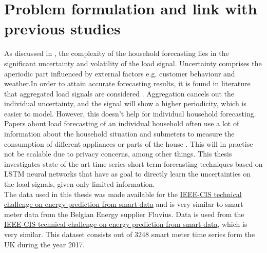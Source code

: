 \section{Problem formulation and link with previous studies}
As discussed in \cite{Shi2018}, the complexity of the household forecasting lies in the significant uncertainty and volatility of the load signal. Uncertainty comprises the aperiodic part influenced by external factors e.g. customer behaviour and weather.In order to attain accurate forecasting results, it is found in literature that aggregated load signals are considered \cite{loadforecastingmoor}. Aggregation cancels out the individual uncertainty, and the signal will show a higher periodicity, which is easier to model. However, this doesn't help for individual household forecasting. Papers about load forecasting of an individual household often use a lot of information about the household situation and submeters to measure the consumption of different appliances or parts of the house \cite{Kim2019}. This will in practise not be scalable due to privacy concerns, among other things. This thesis investigates state of the art time series short term forecasting techniques based on LSTM neural networks that have as goal to directly learn the uncertainties on the load signals, given only limited information.\\


The data used in this thesis was made available for the \href{https://ieee-dataport.org/competitions/ieee-cis-technical-challenge-energy-prediction-smart-meter-data}{IEEE-CIS technical challenge on energy prediction from smart data} and is very similar to smart meter data from the Belgian Energy supplier Fluvius.
Data is used from the \href{https://ieee-dataport.org/competitions/ieee-cis-technical-challenge-energy-prediction-smart-meter-data}{IEEE-CIS technical challenge on energy prediction from smart data}, which is very similar. This dataset consists out of 3248 smart meter time series form the UK during the year 2017. 

